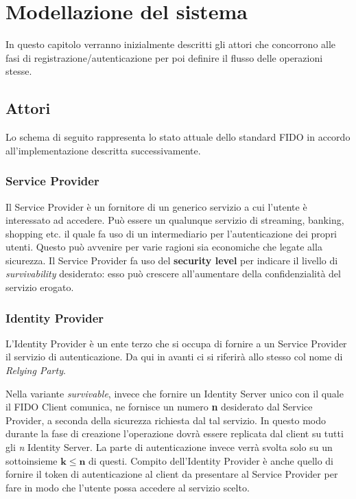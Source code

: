 \chapter{Modellazione del sistema}
\label{modellazione}

In questo capitolo verranno inizialmente descritti gli attori che concorrono alle fasi di registrazione/autenticazione per poi definire il flusso delle operazioni stesse.

\section{Attori}
\label{attori}

Lo schema di seguito rappresenta lo stato attuale dello standard FIDO in accordo all'implementazione descritta successivamente.

\subsection{Service Provider}
\label{service_provider}

Il Service Provider è un fornitore di un generico servizio a cui l'utente è interessato ad accedere. Può essere un qualunque servizio di streaming, banking, shopping etc. il quale fa uso di un intermediario per l'autenticazione dei propri utenti. Questo può avvenire per varie ragioni sia economiche che legate alla sicurezza. Il Service Provider fa uso del \textbf{security level} per indicare il livello di \emph{survivability} desiderato: esso può crescere all'aumentare della confidenzialità del servizio erogato.

\subsection{Identity Provider}
\label{identity_provider}

L'Identity Provider è un ente terzo che si occupa di fornire a un Service Provider il servizio di autenticazione. Da qui in avanti ci si riferirà allo stesso col nome di \emph{Relying Party}. 

Nella variante \emph{survivable}, invece che fornire un Identity Server unico con il quale il FIDO Client comunica, ne fornisce un numero \textbf{n} desiderato dal Service Provider, a seconda della sicurezza richiesta dal tal servizio. In questo modo durante la fase di creazione l'operazione dovrà essere replicata dal client su tutti gli \emph{n} Identity Server. La parte di autenticazione invece verrà svolta solo su un sottoinsieme $\mathbf{k\leq n}$ di questi. Compito dell'Identity Provider è anche quello di fornire il token di autenticazione al client da presentare al Service Provider per fare in modo che l'utente possa accedere al servizio scelto.

